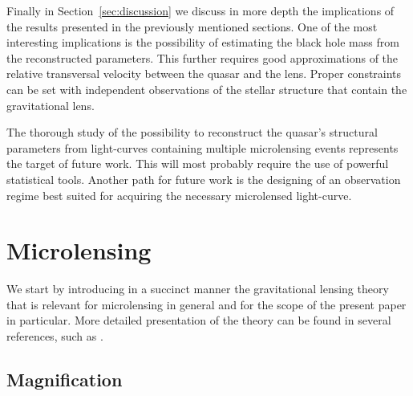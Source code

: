 \documentclass[usenatbib]{mn2e}
\begin{document}
Finally in Section~\ref{sec:discussion} we discuss in more depth the
implications of the results presented in the previously mentioned
sections.  One of the most interesting implications is the possibility
of estimating the black hole mass from the reconstructed
parameters. This further requires good approximations of the relative
transversal velocity between the quasar and the lens. Proper
constraints can be set with independent observations of the stellar
structure that contain the gravitational lens.

The thorough study of the possibility to reconstruct the quasar's
structural parameters from light-curves containing multiple
microlensing events represents the target of future work. This will
most probably require the use of powerful statistical tools. Another
path for future work is the designing of an observation regime best
suited for acquiring the necessary microlensed light-curve.


\section{Microlensing}\label{sec:microlensing}

We start by introducing in a succinct manner the gravitational lensing
theory that is relevant for microlensing in general and for the scope
of the present paper in particular.  More detailed presentation of the
theory can be found in several references, such as
\cite{2001stgl.book.....P}.

\subsection{Magnification}
\end{document}
